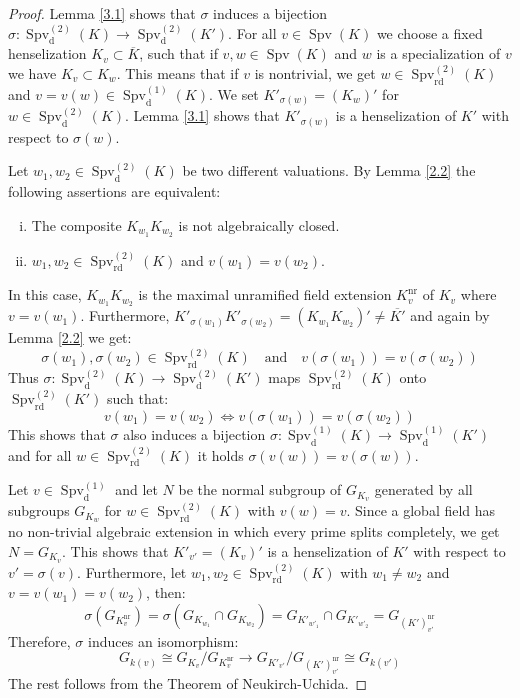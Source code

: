 \begin{proof}
Lemma \ref{3.1} shows that $\sigma$ induces a bijection $\sigma: \operatorname{Spv}_\text{d}^{(2)}(K)\to \operatorname{Spv}_\text{d}^{(2)}(K')$. For all $v\in\operatorname{Spv}(K)$ we choose a fixed henselization $K_v\subset\overline{K}$, such that if $v,w\in\operatorname{Spv}(K)$ and $w$ is a specialization of $v$ we have $K_v\subset K_w$. This means that if $v$ is nontrivial, we get $w\in\operatorname{Spv}_\text{rd}^{(2)}(K)$ and $v=v(w)\in\operatorname{Spv}_\text{d}^{(1)}(K)$. We set $K'_{\sigma(w)} = (K_w)'$ for $w\in\operatorname{Spv}_\text{d}^{(2)}(K)$. Lemma \ref{3.1} shows that $K'_{\sigma(w)}$ is a henselization of $K'$ with respect to $\sigma(w)$.

Let $w_1,w_2 \in\operatorname{Spv}_\text{d}^{(2)}(K)$ be two different valuations. By Lemma \ref{2.2} the following assertions are equivalent:
\begin{enumerate}[(i)]
\item The composite $K_{w_1}K_{w_2}$ is not algebraically closed.
\item $w_1,w_2\in\operatorname{Spv}_\text{rd}^{(2)}(K)$ and $v(w_1) = v(w_2)$.
\end{enumerate}
In this case, $K_{w_1}K_{w_2}$ is the maximal unramified field extension $K_v^\text{nr}$ of $K_v$ where $v=v(w_1)$. Furthermore, $K'_{\sigma(w_1)}K'_{\sigma(w_2)} = (K_{w_1}K_{w_2})' \neq \overline{K'}$ and again by Lemma \ref{2.2} we get: \[\sigma(w_1),\sigma(w_2)\in\operatorname{Spv}_\text{rd}^{(2)}(K)\quad \text{and} \quad v(\sigma(w_1)) = v(\sigma(w_2))\]
Thus $\sigma: \operatorname{Spv}_\text{d}^{(2)}(K)\to \operatorname{Spv}_\text{d}^{(2)}(K')$ maps $\operatorname{Spv}_\text{rd}^{(2)}(K)$ onto $\operatorname{Spv}_\text{rd}^{(2)}(K')$ such that:
\[ v(w_1)=v(w_2) \iff v(\sigma(w_1)) = v(\sigma(w_2)) \]
This shows that $\sigma$ also induces a bijection $\sigma:\operatorname{Spv}_\text{d}^{(1)}(K)\to\operatorname{Spv}_\text{d}^{(1)}(K')$ and for all $w\in\operatorname{Spv}_\text{rd}^{(2)}(K)$ it holds $\sigma(v(w)) = v(\sigma(w))$.

Let $v\in\operatorname{Spv}_\text{d}^{(1)}$ and let $N$ be the normal subgroup of $G_{K_v}$ generated by all subgroups $G_{K_w}$ for $w\in\operatorname{Spv}_\text{rd}^{(2)}(K)$ with $v(w) = v$. Since a global field has no non-trivial algebraic extension in which every prime splits completely, we get $N=G_{K_v}$. This shows that $K'_{v'} = (K_v)'$ is a henselization of $K'$ with respect to $v'=\sigma(v)$. Furthermore, let $w_1,w_2\in\operatorname{Spv}_\text{rd}^{(2)}(K)$ with $w_1\neq w_2$ and $v=v(w_1)=v(w_2)$, then:
\[ \sigma(G_{K^\text{nr}_v}) = \sigma(G_{K_{w_1}}\cap G_{K_{w_2}}) = G_{K'_{w'_1}}\cap G_{K'_{w'_2}} = G_{(K')^\text{nr}_{v'}} \]
Therefore, $\sigma$ induces an isomorphism:
\[ G_{k(v)} \cong G_{K_v}/G_{K_v^\text{nr}} \to G_{K'_{v'}}/G_{(K')_{v'}^\text{nr}}\cong G_{k(v')} \]
The rest follows from the Theorem of Neukirch-Uchida.
\end{proof}

